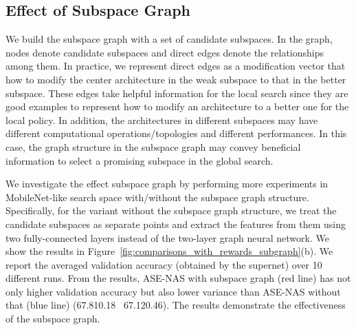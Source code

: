 \documentclass[lettersize,journal]{IEEEtran}
\newcommand{\sexyname}{ASE-NAS\xspace}
\begin{document}
\subsection{Effect of Subspace Graph}\label{sec:ablation_subspace_graph}

We build the subspace graph with a set of candidate subspaces.
In the graph, nodes denote candidate subspaces and direct edges denote the relationships among them.
In practice, we represent direct edges as a modification vector that how to modify the center architecture in the weak subspace to that in the better subspace.
These edges take helpful information for the local search since they are good examples to represent how to modify an architecture to a better one for the local policy.
In addition, the architectures in different subspaces may have different computational operations/topologies and different performances.
In this case, the graph structure in the subspace graph may convey beneficial information to select a promising subspace in the global search.

We investigate the effect subspace graph by performing more experiments in MobileNet-like search space with/without the subspace graph structure.
Specifically, for the variant without the subspace graph structure, we treat the candidate subspaces as separate points and extract the features from them using two fully-connected layers instead of the two-layer graph neural network.
We show the results in Figure~\ref{fig:comparisons_with_rewards_subgraph}(b).
We report the averaged validation accuracy (obtained by the supernet) over 10 different runs.
From the results, \sexyname with subspace graph (red line) has not only higher validation accuracy but also lower variance than \sexyname without that (blue line) (67.810.18 \vs~67.120.46).
The results demonstrate the effectiveness of the subspace graph.

\begin{figure*}[!t]
\centering
{}
\hfil
{}
\caption{Comparisons of the search performance with different reward functions(a) and with/without subspace graph(b) in MobileNet-like search space on ImageNet.}
\label{fig:comparisons_with_rewards_subgraph}
\end{figure*}
\end{document}

